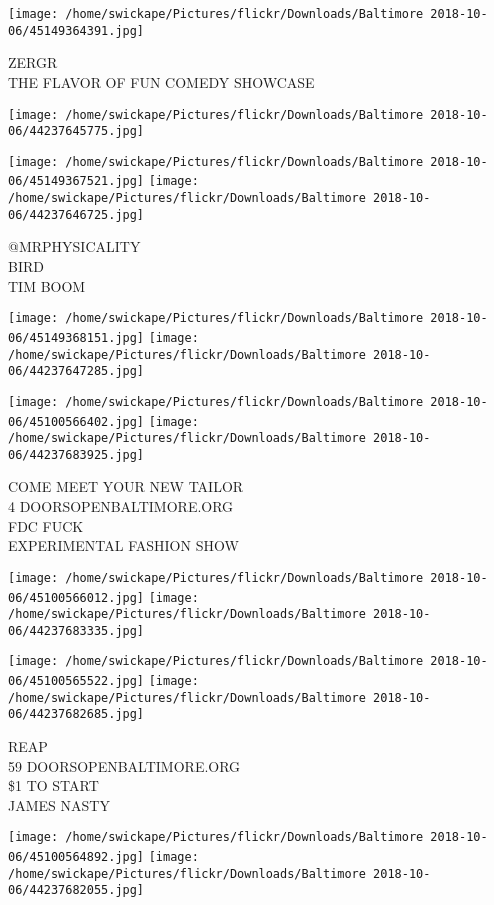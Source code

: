 \documentclass[10pt,letterpaper]{article}
\begin{document}
\vspace{0.25in}
\texttt{[image: /home/swickape/Pictures/flickr/Downloads/Baltimore 2018-10-06/45149364391.jpg]}

ZERGR\\
THE FLAVOR OF FUN COMEDY SHOWCASE
\pagebreak

\texttt{[image: /home/swickape/Pictures/flickr/Downloads/Baltimore 2018-10-06/44237645775.jpg]}

\vspace{0.25in}
\texttt{[image: /home/swickape/Pictures/flickr/Downloads/Baltimore 2018-10-06/45149367521.jpg]}
\texttt{[image: /home/swickape/Pictures/flickr/Downloads/Baltimore 2018-10-06/44237646725.jpg]}

@MRPHYSICALITY\\
BIRD\\
TIM BOOM
\pagebreak

\texttt{[image: /home/swickape/Pictures/flickr/Downloads/Baltimore 2018-10-06/45149368151.jpg]}
\texttt{[image: /home/swickape/Pictures/flickr/Downloads/Baltimore 2018-10-06/44237647285.jpg]}

\texttt{[image: /home/swickape/Pictures/flickr/Downloads/Baltimore 2018-10-06/45100566402.jpg]}
\texttt{[image: /home/swickape/Pictures/flickr/Downloads/Baltimore 2018-10-06/44237683925.jpg]}

COME MEET YOUR NEW TAILOR\\
4 DOORSOPENBALTIMORE.ORG\\
FDC FUCK\\
EXPERIMENTAL FASHION SHOW
\pagebreak

\texttt{[image: /home/swickape/Pictures/flickr/Downloads/Baltimore 2018-10-06/45100566012.jpg]}
\texttt{[image: /home/swickape/Pictures/flickr/Downloads/Baltimore 2018-10-06/44237683335.jpg]}

\texttt{[image: /home/swickape/Pictures/flickr/Downloads/Baltimore 2018-10-06/45100565522.jpg]}
\texttt{[image: /home/swickape/Pictures/flickr/Downloads/Baltimore 2018-10-06/44237682685.jpg]}

REAP\\
59 DOORSOPENBALTIMORE.ORG\\
\$1 TO START\\
JAMES NASTY
\pagebreak

\texttt{[image: /home/swickape/Pictures/flickr/Downloads/Baltimore 2018-10-06/45100564892.jpg]}
\texttt{[image: /home/swickape/Pictures/flickr/Downloads/Baltimore 2018-10-06/44237682055.jpg]}
\end{document}
